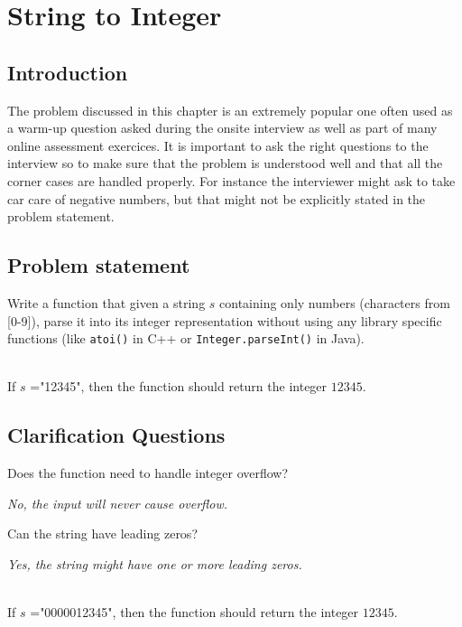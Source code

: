 %

\chapter{String to Integer}
\label{ch:string_to_int}
\section*{Introduction}
The problem discussed in this chapter is an extremely popular one often used as a warm-up question asked during the onsite interview as well as part of many online assessment exercices. It is important to ask the right questions to the interview so to make sure that the problem is understood well and that all the corner cases are handled properly. For instance the interviewer might ask  to take car care of negative numbers, but that might not be explicitly stated in the problem statement.

\section{Problem statement}
\begin{exercise}
Write a function that given a string $s$ containing only numbers (characters from [0-9]), parse it into its integer representation without using any library specific functions (like \texttt{atoi()} in C++ or  \texttt{Integer.parseInt()} in Java).
\end{exercise}


\begin{example}
	\hfill \\
	If $s$ ="12345", then the function should return the integer $12345$.	
\end{example}


\section{Clarification Questions}

\begin{QandA}
	\item Does the function need to handle integer overflow?
	\begin{answered}
		\textit{No, the input will never cause overflow.}
	\end{answered}

	\item Can the string have leading zeros?
	\begin{answered}
		\textit{Yes, the string might have one or more leading zeros.}
		\begin{example}
			\hfill \\
			If $s$ ="0000012345", then the function should return the integer $12345$.	
		\end{example}
	\end{answered}
	
\end{QandA}

